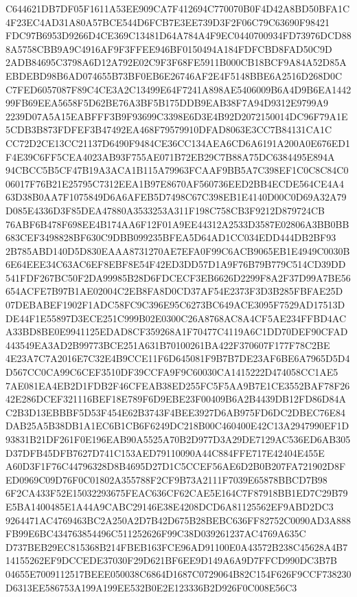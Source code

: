 \documentclass[UTF8,fontset=fandol,zihao=-4,a4paper]{ctexart}
\begin{document}
{{C644621DB7DF05F1611A53EE909CA7F412694C770070B0F4D42A8BD50BFA1C4F23EC4AD31A80A57BCE544D6FCB7E3EE739D3F2F06C79C63690F98421
FDC97B6953D9266D4CE369C13481D64A784A4F9EC0440700934FD73976DCD888A5758CBB9A9C4916AF9F3FFEE946BF0150494A184FDFCBD8FAD50C9D
2ADB84695C3798A6D12A792E02C9F3F68FE5911B000CB18BCF9A84A52D85AEBDEBD98B6AD074655B73BF0EB6E26746AF2E4F5148BBE6A2516D268D0C
C7FED6057087F89C4CE3A2C13499E64F7241A898AE5406009B6A4D9B6EA144299FB69EEA5658F5D62BE76A3BF5B175DDB9EAB38F7A94D9312E9799A9
2239D07A5A15EABFFF3B9F93699C3398E6D3E4B92D2072150014DC96F79A1E5CDB3B873FDFEF3B47492EA468F79579910DFAD8063E3CC7B84131CA1C
CC72D2CE13CC21137D6490F9484CE36CC134AEA6CD6A6191A200A0E676ED1F4E39C6FF5CEA4023AB93F755AE071B72EB29C7B88A75DC6384495E894A
94CBCC5B5CF47B19A3ACA1B115A79963FCAAF9BB5A7C398EF1C0C8C84C006017F76B21E25795C7312EEA1B97E8670AF560736EED2BB4ECDE564CE4A4
63D38B0AA7F1075849D6A6AFEB5D7498C67C398EB1E4140D00C0D69A32A79D085E4336D3F85DEA47880A3533253A311F198C758CB3F9212D879724CB
76ABF6B478F698EE4B174AA6F12F01A9EE44312A2533D3587E02806A3BB0BB683CEF3498828BF630C9DBB099235BFEA5D64AD1CC034EDD444DB2BF93
2B785ABD140D5D830EAAA8731270AE7EFA0F99C6ACB9065EB1E4949C0030B6E64EEE34C63AC6EF8EBF8E54F42ED3DD57D1A9F76B79B779C514CD39DD
541FDF267BC50F2DA99985B28D6FDCECF3EB6626D2299F8A2F37D99A7BE56654ACFE7B97B1AE02004C2EB8FA8D0CD37AF54E2373F3D3B285FBFAE25D
07DEBABEF1902F1ADC58FC9C396E95C6273BC649ACE3095F7529AD17513DDE44F1E55897D3ECE251C999B02E0300C26A8768AC8A4CF5AE234FFBD4AC
A33BD8BE0E9941125EDAD8CF359268A1F70477C4119A6C1DD70DEF90CFAD443549EA3AD2B99773BCE251A631B70100261BA422F370607F177F78C2BE
4E23A7C7A2016E7C32E4B9CCE11F6D645081F9B7B7DE23AF6BE6A7965D5D4D567CC0CA99C6CEF3510DF39CCFA9F9C60030CA1415222D474058CC1AE5
7AE081EA4EB2D1FDB2F46CFEAB38ED255FC5F5AA9B7E1CE3552BAF78F2642E286DCEF321116BEF18E789F6D9EBE23F00409B6A2B4439DB12FD86D84A
C2B3D13EBBBF5D53F454E62B3743F4BEE3927D6AB975FD6DC2DBEC76E84DAB25A5B38DB1A1EC6B1CB6F6249DC218B00C460400E42C13A2947990EF1D
93831B21DF261F0E196EAB90A5525A70B2D977D3A29DE7129AC536ED6AB305D37DFB45DFB7627D741C153AED79110090A44C884FFE717E42404E455E
A60D3F1F76C44796328D8B4695D27D1C5CCEF56AE6D2B0B207FA721902D8FED0969C09D76F0C01802A355788F2CF9B73A2111F7039E65878BBCD7B98
6F2CA433F52E15032293675FEAC636CF62CAE5E164C7F87918BB1ED7C29B79E5BA1400485E1A44A9CABC29146E38E4208DCD6A81125562EF9ABD2DC3
9264471AC4769463BC2A250A2D7B42D675B28BEBC636FF82752C0090AD3A888FB99E6BC434763854496C511252626F99C38D039261237AC4769A635C
D737BEB29EC815368B214FBEB163FCE96AD91100E0A43572B238C45628A4B714155262EF9DCCEDE37030F29D621BF6EE9D149A6A9D7FFCD990DC3B7B
04655E7009112517BEEE050038C6864D1687C0729064B82C154F626F9CCF738230D6313EE586753A199A199EE532B0E2E123336B2D926F0C008E56C3
}}
\end{document}
